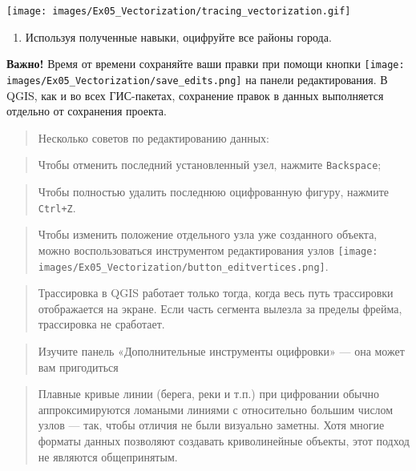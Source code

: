 \documentclass[
  12pt,
]{book}
\providecommand{\tightlist}{%
  \setlength{\itemsep}{0pt}\setlength{\parskip}{0pt}}
\begin{document}
\texttt{[image: images/Ex05\_Vectorization/tracing\_vectorization.gif]}

\begin{enumerate}
\def\labelenumi{\arabic{enumi}.}
\setcounter{enumi}{13}
\tightlist
\item
  Используя полученные навыки, оцифруйте все районы города.
\end{enumerate}

\textbf{Важно!} Время от времени сохраняйте ваши правки при помощи кнопки \texttt{[image: images/Ex05\_Vectorization/save\_edits.png]} на панели редактирования. В QGIS, как и во всех ГИС-пакетах, сохранение правок в данных выполняется отдельно от сохранения проекта.

\begin{quote}
Несколько советов по редактированию данных:
\end{quote}

\begin{quote}
Чтобы отменить последний установленный узел, нажмите \texttt{Backspace};
\end{quote}

\begin{quote}
Чтобы полностью удалить последнюю оцифрованную фигуру, нажмите \texttt{Ctrl+Z}.
\end{quote}

\begin{quote}
Чтобы изменить положение отдельного узла уже созданного объекта, можно воспользоваться инструментом редактирования узлов \texttt{[image: images/Ex05\_Vectorization/button\_editvertices.png]}.
\end{quote}

\begin{quote}
Трассировка в QGIS работает только тогда, когда весь путь трассировки отображается на экране. Если часть сегмента вылезла за пределы фрейма, трассировка не сработает.
\end{quote}

\begin{quote}
Изучите панель «Дополнительные инструменты оцифровки» --- она может вам пригодиться
\end{quote}

\begin{quote}
Плавные кривые линии (берега, реки и т.п.) при цифровании обычно аппроксимируются ломаными линиями с относительно большим числом узлов --- так, чтобы отличия не были визуально заметны. Хотя многие форматы данных позволяют создавать криволинейные объекты, этот подход не являются общепринятым.
\end{quote}
\end{document}
